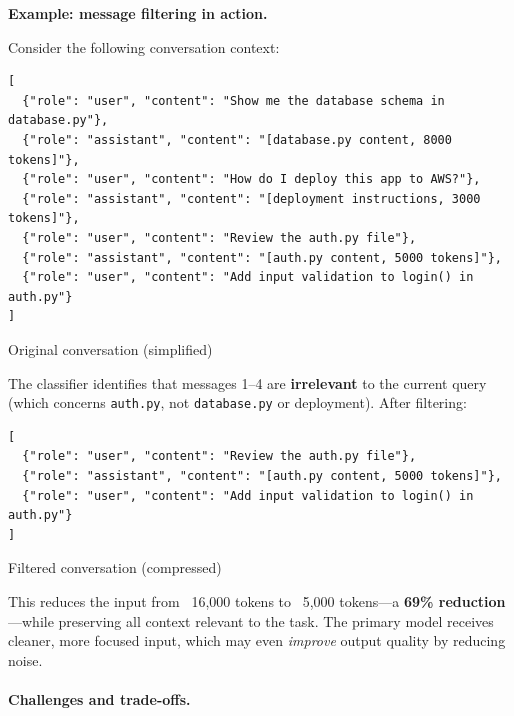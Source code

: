 \documentclass[english]{article}
\begin{document}
\textbf{Example: message filtering in action.}

Consider the following conversation context:

\begin{listing}[H]
\begin{verbatim}
[
  {"role": "user", "content": "Show me the database schema in database.py"},
  {"role": "assistant", "content": "[database.py content, 8000 tokens]"},
  {"role": "user", "content": "How do I deploy this app to AWS?"},
  {"role": "assistant", "content": "[deployment instructions, 3000 tokens]"},
  {"role": "user", "content": "Review the auth.py file"},
  {"role": "assistant", "content": "[auth.py content, 5000 tokens]"},
  {"role": "user", "content": "Add input validation to login() in auth.py"}
]
\end{verbatim}
\caption{Original conversation (simplified)}
\end{listing}

The classifier identifies that messages 1--4 are \textbf{irrelevant} to the current query (which concerns \texttt{auth.py}, not \texttt{database.py} or deployment). After filtering:

\begin{listing}[H]
\begin{verbatim}
[
  {"role": "user", "content": "Review the auth.py file"},
  {"role": "assistant", "content": "[auth.py content, 5000 tokens]"},
  {"role": "user", "content": "Add input validation to login() in auth.py"}
]
\end{verbatim}
\caption{Filtered conversation (compressed)}
\end{listing}

This reduces the input from ~16,000 tokens to ~5,000 tokens—a \textbf{69\% reduction}—while preserving all context relevant to the task. The primary model receives cleaner, more focused input, which may even \emph{improve} output quality by reducing noise.

\paragraph{Challenges and trade-offs.}
\end{document}
